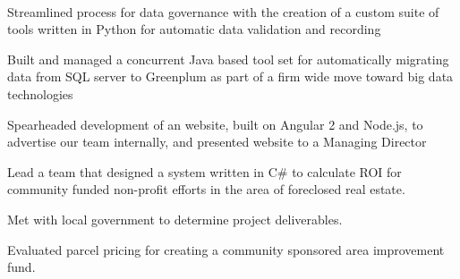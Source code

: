 \documentclass[letterpaper]{deedy-resume-openfont} %
\begin{document}
\begin{minipage}[t]{0.66\textwidth}
\begin{tightitemize}
\end{tightitemize}
\sectionspace %

\\

\begin{tightitemize}
\item Streamlined process for data governance with the creation of a custom suite of tools written in Python for automatic data validation and recording
\item Built and managed a concurrent Java based tool set for automatically migrating data from SQL server to Greenplum as part of a firm wide move toward big data technologies
\item Spearheaded development of an website, built on Angular 2 and Node.js, to advertise our team internally, and presented website to a Managing Director
\end{tightitemize}

\sectionspace %
\begin{tightitemize}
\item  Lead a team that designed a system written in C\# to calculate ROI for community funded non-profit efforts in the area of foreclosed real estate.
\item Met with local government to determine project deliverables.
\item Evaluated parcel pricing for creating a community sponsored area improvement fund.
\end{tightitemize}



\end{minipage}
\end{document}

